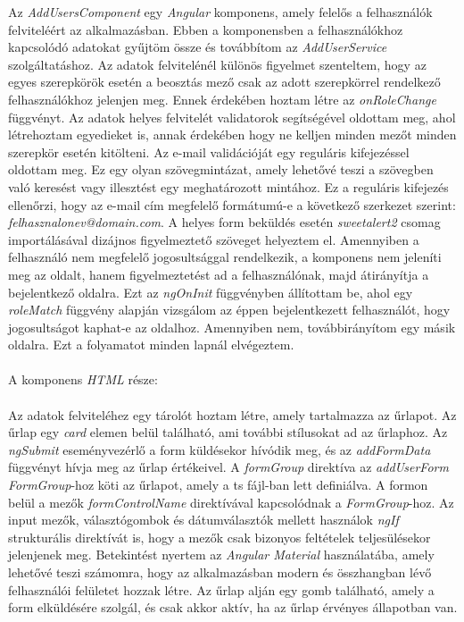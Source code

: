 Az \textit{AddUsersComponent} egy \textit{Angular} komponens, amely felelős a felhasználók felviteléért az alkalmazásban. Ebben a komponensben a felhasználókhoz kapcsolódó adatokat gyűjtöm össze és továbbítom az \textit{AddUserService} szolgáltatáshoz. Az adatok felvitelénél különös figyelmet szenteltem, hogy az egyes szerepkörök esetén a beosztás mező csak az adott szerepkörrel rendelkező felhasználókhoz jelenjen meg. Ennek érdekében hoztam létre az \textit{onRoleChange} függvényt. Az adatok helyes felvitelét validatorok segítségével oldottam meg, ahol létrehoztam egyedieket is, annak érdekében hogy ne kelljen minden mezőt minden szerepkör esetén kitölteni. Az e-mail validációját egy reguláris kifejezéssel oldottam meg. Ez egy olyan szövegmintázat, amely lehetővé teszi a szövegben való keresést vagy illesztést egy meghatározott mintához. Ez a reguláris kifejezés ellenőrzi, hogy az e-mail cím megfelelő formátumú-e a következő szerkezet szerint: \textit{felhasznalonev@domain.com}. A helyes form beküldés esetén \textit{sweetalert2} csomag importálásával dizájnos figyelmeztető szöveget helyeztem el. Amennyiben a felhasználó nem megfelelő jogosultsággal rendelkezik, a komponens nem jeleníti meg az oldalt, hanem figyelmeztetést ad a felhasználónak, majd átirányítja a bejelentkező oldalra. Ezt az \textit{ngOnInit} függvényben állítottam be, ahol egy \textit{roleMatch} függvény alapján vizsgálom az éppen bejelentkezett felhasználót, hogy jogosultságot kaphat-e az oldalhoz. Amennyiben nem, továbbirányítom egy másik oldalra. Ezt a folyamatot minden lapnál elvégeztem.\\
\\A komponens \textit{HTML} része:\\
\\
Az adatok felviteléhez egy tárolót hoztam létre, amely tartalmazza az űrlapot. Az űrlap egy \textit{card} elemen belül található, ami további stílusokat ad az űrlaphoz. Az \textit{ngSubmit} eseményvezérlő a form küldésekor hívódik meg, és az \textit{addFormData} függvényt hívja meg az űrlap értékeivel. A \textit{formGroup} direktíva az \textit{addUserForm} \textit{FormGroup}-hoz köti az űrlapot, amely a ts fájl-ban lett definiálva. A formon belül a mezők \textit{formControlName} direktívával kapcsolódnak a \textit{FormGroup}-hoz. Az input mezők, választógombok és dátumválasztók mellett használok \textit{ngIf} strukturális direktívát is, hogy a mezők csak bizonyos feltételek teljesülésekor jelenjenek meg. Betekintést nyertem az \textit{Angular Material} használatába, amely lehetővé teszi számomra, hogy az alkalmazásban modern és összhangban lévő felhasználói felületet hozzak létre. Az űrlap alján egy gomb található, amely a form elküldésére szolgál, és csak akkor aktív, ha az űrlap érvényes állapotban van. 

